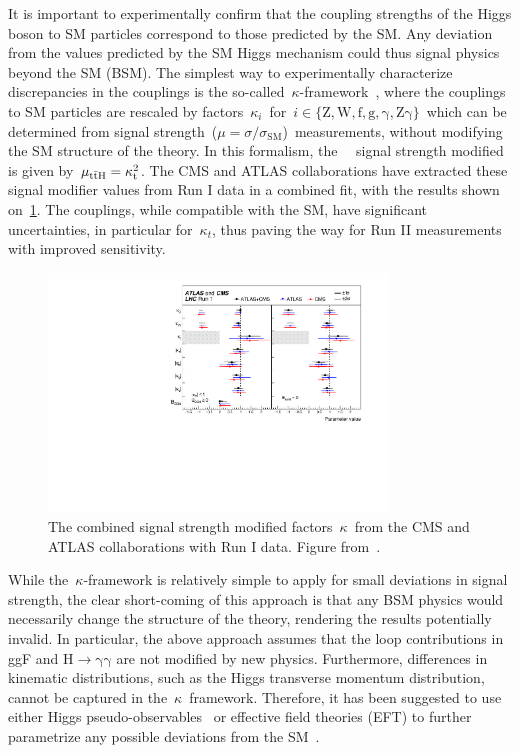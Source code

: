 It is important to experimentally confirm that the coupling strengths of the Higgs boson to SM particles correspond to those predicted by the SM. Any deviation from the values predicted by the SM Higgs mechanism could thus signal physics beyond the SM (BSM). The simplest way to experimentally characterize discrepancies in the couplings is the so-called~$\kappa$-framework~\cite{Heinemeyer:2013tqa}, where the couplings to SM particles are rescaled by factors~$\kappa_i$~for~$i \in \{\mathrm{Z}, \mathrm{W}, \mathrm{f}, \mathrm{g}, \mathrm{\gamma}, \mathrm{Z\gamma}\}$~which can be determined from signal strength~($\mu = \sigma / \sigma_{\mathrm{SM}}$)~measurements, without modifying the SM structure of the theory. In this formalism, the~\ttH~ signal strength modified is given by~$\mu_{\mathrm{t} \bar{\mathrm{t}} \mathrm{H}} = \kappa_{\mathrm{t}}^2$. The CMS and ATLAS collaborations have extracted these signal modifier values from Run I data in a combined fit, with the results shown on~\cref{fig:higgs_kappa}. The couplings, while compatible with the SM, have significant uncertainties, in particular for~$\kappa_t$, thus paving the way for Run II measurements with improved sensitivity.

\begin{figure}
\begin{centering}
\includegraphics[width=0.8\textwidth]{figures/theory/CMS-HIG-15-002_Figure_015.pdf}
\caption[The Higgs signal strength modifier factors as measured by CMS and ATLAS]{The combined signal strength modified factors~$\kappa$~from the CMS and ATLAS collaborations with Run I data. Figure from~\cite{Khachatryan:2016vau}.}
\label{fig:higgs_kappa}
\end{centering}
\end{figure}

While the~$\kappa$-framework is relatively simple to apply for small deviations in signal strength, the clear short-coming of this approach is that any BSM physics would necessarily change the structure of the theory, rendering the results potentially invalid. In particular, the above approach assumes that the loop contributions in ggF and $\mathrm{H} \rightarrow \mathrm{\gamma} \mathrm{\gamma}$ are not modified by new physics. Furthermore, differences in kinematic distributions, such as the Higgs transverse momentum distribution, cannot be captured in the~$\kappa$~framework. Therefore, it has been suggested to use either Higgs pseudo-observables~\cite{Gonzalez-Alonso:2014eva} or effective field theories (EFT) to further parametrize any possible deviations from the SM~\cite{Buchmuller:1985jz,Grzadkowski:2010es}.

